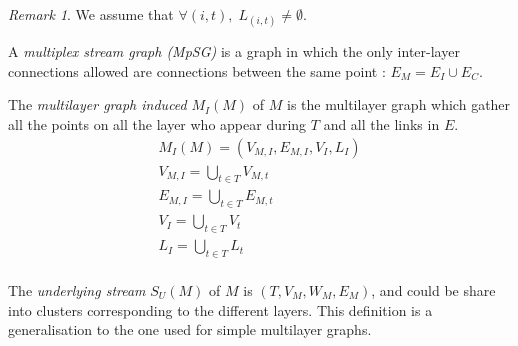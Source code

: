 \documentclass[dvipsnames,a4paper,11pt]{article}
\theoremstyle{definition}
\theoremstyle{remark}
\newtheorem{rmq}{Remark}
\theoremstyle{remark}
\begin{document}
    \begin{rmq}
    	We assume that $\forall (i,t), \; L_{(i,t)} \neq \emptyset$.
    \end{rmq}

    A {\em multiplex stream graph (MpSG)} is a graph in which the only inter-layer connections allowed are connections between the same point : $E_M = E_I \cup E_C$.

    The {\em multilayer graph induced} $M_I(M)$ of $M$ is the multilayer graph which gather all the points on all the layer who appear during $T$ and all the links in $E$.
    \begin{align*}
    	M_I(M) = (V_{M,I}, E_{M,I}, V_I,L_I)\\
    	V_{M,I} = \bigcup_{t\in T} V_{M,t}\\
    	E_{M,I} = \bigcup_{t\in T} E_{M,t}\\
    	V_I = \bigcup_{t\in T} V_t \\
    	L_I = \bigcup_{t\in T} L_t\\
    \end{align*}

    The {\em underlying stream } $S_U(M)$ of $M$ is $(T,V_M,W_M,E_M)$, and could be share into clusters corresponding to the different layers. This definition is a generalisation to the one used for simple multilayer graphs.
\end{document}
